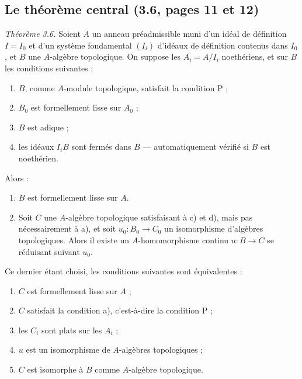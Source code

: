 \documentclass[11pt,a4paper]{article}
\begin{document}
\subsection*{Le théorème central (3.6, pages 11 et 12)}

\emph{Théorème 3.6.} Soient $A$ un anneau préadmissible muni d'un idéal de
définition $I = I_0$ et d'un système fondamental $(I_i)$ d'idéaux de définition
contenus dans $I_0$, et $B$ une $A$-algèbre topologique. On suppose les
$A_i = A/I_i$ noethériens, et sur $B$ les conditions suivantes :

\begin{enumerate}
  \item[a)] $B$, comme $A$-module topologique, satisfait la condition P ;
  \item[b)] $B_0$ est formellement lisse sur $A_0$ ;
  \item[c)] $B$ est adique ;
  \item[d)] les idéaux $I_iB$ sont fermés dans $B$ — automatiquement vérifié
  si $B$ est noethérien.
\end{enumerate}

Alors :

\begin{enumerate}
  \item[(i)] $B$ est formellement lisse sur $A$.
  \item[(ii)] Soit $C$ une $A$-algèbre topologique satisfaisant à c) et d),
  mais pas nécessairement à a), et soit $u_0 : B_0 \to C_0$ un isomorphisme
  d'algèbres topologiques. Alors il existe un $A$-homomorphisme continu
  $u : B \to C$ se réduisant suivant $u_0$.
\end{enumerate}

Ce dernier étant choisi, les conditions suivantes sont équivalentes :

\begin{enumerate}
  \item[1)] $C$ est formellement lisse sur $A$ ;
  \item[2)] $C$ satisfait la condition a), c'est-à-dire la condition P ;
  \item[3)] les $C_i$ sont plats sur les $A_i$ ;
  \item[4)] $u$ est un isomorphisme de $A$-algèbres topologiques ;
  \item[5)] $C$ est isomorphe à $B$ comme $A$-algèbre topologique.
\end{enumerate}
\end{document}
